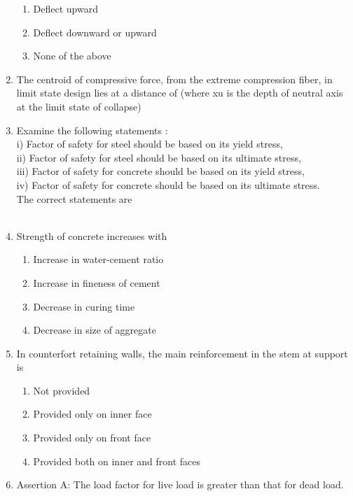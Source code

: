 \documentclass[11pt,a4paper]{article}
\begin{document}
\begin{enumerate}
\begin{enumerate}[label=\Alph*.]
\item{Deflect upward}
\item{Deflect downward or upward}
\item{None of the above}
\end{enumerate}
\item{The centroid of compressive force, from the extreme compression fiber, in limit state design lies at a distance of (where xu is the depth of neutral axis at the limit state of collapse)}
\\
\item{Examine the following statements : \\
i) Factor of safety for steel should be based on its yield stress, \\
ii) Factor of safety for steel should be based on its ultimate stress, \\
iii) Factor of safety for concrete should be based on its yield stress, \\
iv) Factor of safety for concrete should be based on its ultimate stress. \\
The correct statements are \\
}
\\
\item{Strength of concrete increases with}
\begin{enumerate}[label=\Alph*.]
\item{Increase in water-cement ratio}
\item{Increase in fineness of cement}
\item{Decrease in curing time}
\item{Decrease in size of aggregate}
\end{enumerate}
\item{In counterfort retaining walls, the main reinforcement in the stem at support is}
\begin{enumerate}[label=\Alph*.]
\item{Not provided}
\item{Provided only on inner face}
\item{Provided only on front face}
\item{Provided both on inner and front faces}
\end{enumerate}
\item{Assertion A: The load factor for live load is greater than that for dead load. \\

}
\end{enumerate}
\end{document}
